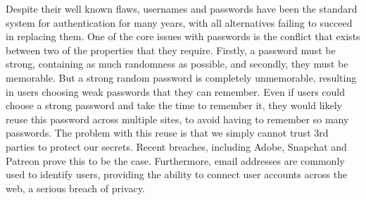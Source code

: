 Despite their well known flaws, usernames and passwords have been the standard system for authentication for many years, with all alternatives failing to succeed in replacing them. One of the core issues with passwords is the conflict that exists between two of the properties that they require. Firstly, a password must be strong, containing as much randomness as possible, and secondly, they must be memorable. But a strong random password is completely unmemorable, resulting in users choosing weak passwords that they can remember. Even if users could choose a strong password and take the time to remember it, they would likely reuse this password across multiple sites, to avoid having to remember so many passwords. The problem with this reuse is that we simply cannot trust 3rd parties to protect our secrets. Recent breaches, including Adobe, Snapchat and Patreon prove this to be the case. Furthermore, email addresses are commonly used to identify users, providing the ability to connect user accounts across the web, a serious breach of privacy.
